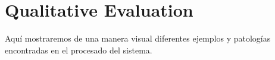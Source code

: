 


\section{Qualitative Evaluation}

Aquí mostraremos de una manera visual diferentes ejemplos y patologías
encontradas en el procesado del sistema.
